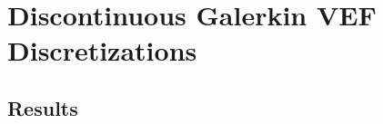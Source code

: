 \documentclass[../doc.tex]{subfiles}
\begin{document}
\chapter{Discontinuous Galerkin VEF Discretizations}

\section{Results}

\begin{table}
\centering
\caption{}
\label{}

\end{table}
\end{document}
